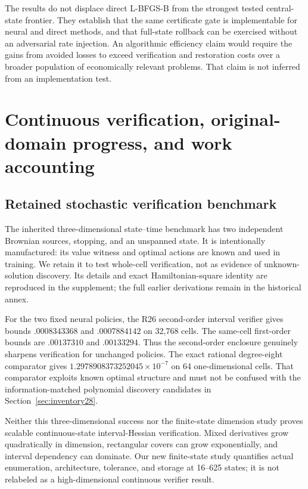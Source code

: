 The results do not displace direct L-BFGS-B from the strongest tested central-state frontier. They establish that the same certificate gate is implementable for neural and direct methods, and that full-state rollback can be exercised without an adversarial rate injection. An algorithmic efficiency claim would require the gains from avoided losses to exceed verification and restoration costs over a broader population of economically relevant problems. That claim is not inferred from an implementation test.

\section{Continuous verification, original-domain progress, and work accounting}\label{sec:record28}
\subsection{Retained stochastic verification benchmark}
The inherited three-dimensional state--time benchmark has two independent Brownian sources, stopping, and an unspanned state. It is intentionally manufactured: its value witness and optimal actions are known and used in training. We retain it to test whole-cell verification, not as evidence of unknown-solution discovery. Its details and exact Hamiltonian-square identity are reproduced in the supplement; the full earlier derivations remain in the historical annex.

For the two fixed neural policies, the R26 second-order interval verifier gives bounds $.0008343368$ and $.0007884142$ on 32,768 cells. The same-cell first-order bounds are $.00137310$ and $.00133294$. Thus the second-order enclosure genuinely sharpens verification for unchanged policies. The exact rational degree-eight comparator gives $1.2978908373252045\times10^{-7}$ on 64 one-dimensional cells. That comparator exploits known optimal structure and must not be confused with the information-matched polynomial discovery candidates in Section~\ref{sec:inventory28}.

Neither this three-dimensional success nor the finite-state dimension study proves scalable continuous-state interval-Hessian verification. Mixed derivatives grow quadratically in dimension, rectangular covers can grow exponentially, and interval dependency can dominate. Our new finite-state study quantifies actual enumeration, architecture, tolerance, and storage at 16--625 states; it is not relabeled as a high-dimensional continuous verifier result.

